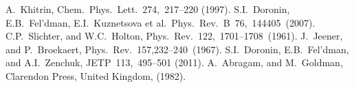 \begin{thebibliography}{}

%
%
%
%
%
%
%
%
%
%
%
A.~Khitrin, Chem.~Phys.~Lett.~274,~217–220 (1997).
%
%
%
%
S.I.~Doronin, E.B.~Fel’dman, E.I.~Kuznetsova et al.~Phys.~Rev.~B~76,~144405~(2007).
%
%
C.P.~Slichter, and  W.C.~Holton, Phys.~Rev.~122,~1701–1708~(1961).
%
J.~Jeener, and P.~Broekaert, Phys.~Rev.~157,232–240~(1967).
%
%
S.I.~Doronin, E.B.~Fel’dman, and  A.I.~Zenchuk, JETP~113,~495–501 (2011).
%
A.~Abragam, and M.~Goldman, Clarendon Press, United Kingdom, (1982).
%
%

\end{thebibliography}
